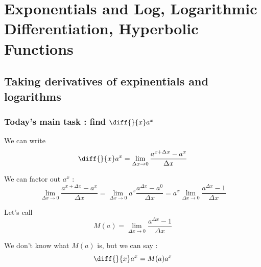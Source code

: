 

\chapter{Exponentials and Log, Logarithmic Differentiation, Hyperbolic Functions}

\bigbreak
\section{Taking derivatives of expinentials and logarithms}

\subsection{Today's main task : find $\diff{}{x} a^x$}

We can write $$ \diff{}{x} a^x = \lim_{\Delta x \to 0} \frac{a^{x+\Delta x} - a^x}{\Delta x} $$

We can factor out $a^x$ : 
$$ \lim_{\Delta x \to 0} \frac{a^{x+\Delta x}-a^x}{\Delta x} 
	= \lim_{\Delta x \to 0} a^x \frac{a^{\Delta x} - a^0}{\Delta x}
	= a^x \lim_{\Delta x \to 0} \frac{a^{\Delta x} - 1}{\Delta x}
$$

Let's call $$ M(a) = \lim_{\Delta x \to 0} \frac{a^{\Delta x} - 1}{\Delta x} $$

We don't know what $M(a)$ is, but we can say : $$ \diff{}{x} a^x = M(a) a^x $$

